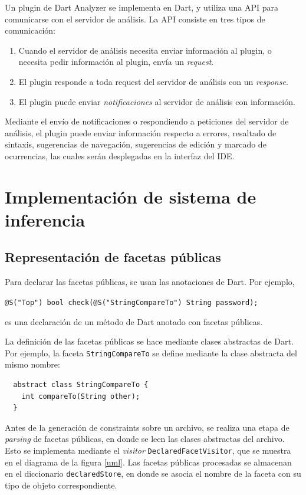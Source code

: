 Un plugin de Dart Analyzer se implementa en Dart, y utiliza una API para comunicarse con el servidor de análisis. La API consiste en tres tipos de comunicación:

\begin{enumerate}
  \item Cuando el servidor de análisis necesita enviar información al plugin, o necesita pedir información al plugin, envía un \emph{request}.
  \item El plugin responde a toda request del servidor de análisis con un \emph{response}.
  \item El plugin puede enviar \emph{notificaciones} al servidor de análisis con información.
\end{enumerate}

Mediante el envío de notificaciones o respondiendo a peticiones del servidor de análisis, el plugin puede enviar información respecto a errores, resaltado de sintaxis, sugerencias de navegación, sugerencias de edición y marcado de ocurrencias, las cuales serán desplegadas en la interfaz del IDE.

\section{Implementación de sistema de inferencia}

\subsection{Representación de facetas públicas}
Para declarar las facetas públicas, se usan las anotaciones de Dart. Por ejemplo,

 \texttt{@S("Top") bool check(@S("StringCompareTo") String password);}

 es una declaración de un método de Dart anotado con facetas públicas.

La definición de las facetas públicas se hace mediante clases abstractas de Dart. Por ejemplo, la faceta \texttt{StringCompareTo} se define mediante la clase abstracta del mismo nombre:
\vspace{0.8em}
\begin{lstlisting}
  abstract class StringCompareTo {
    int compareTo(String other);
  }
\end{lstlisting}

Antes de la generación de constraints sobre un archivo, se realiza una etapa de \textit{parsing} de facetas públicas, en donde se leen las clases abstractas del archivo. Esto se implementa mediante el \emph{visitor} \texttt{DeclaredFacetVisitor}, que se muestra en el diagrama de la figura \ref{uml}. Las facetas públicas procesadas se almacenan en el diccionario \texttt{declaredStore}, en donde se asocia el nombre de la faceta con su tipo de objeto correspondiente.

